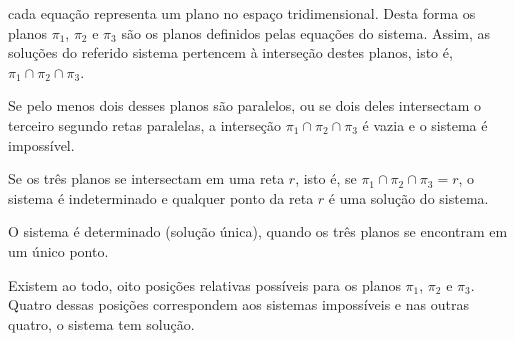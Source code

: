 \documentclass[oneside,a4paper,12pt]{article}
\begin{document}
cada equação representa um plano no espaço tridimensional. Desta forma os planos $\pi_1$, $\pi_2$ e $\pi_3$ são os planos definidos pelas equações do sistema. Assim, as soluções do referido sistema pertencem à interseção destes planos, isto é, $\pi_1 \cap \pi_2 \cap \pi_3$.

Se pelo menos dois desses planos são paralelos, ou se dois deles intersectam o terceiro segundo retas paralelas, a interseção $\pi_1 \cap \pi_2 \cap \pi_3$ é vazia e o sistema é impossível.

Se os três planos se intersectam em uma reta $r$, isto é, se $\pi_1 \cap \pi_2 \cap \pi_3 = r$, o sistema é indeterminado e qualquer ponto da reta $r$ é uma solução do sistema.

O sistema é determinado (solução única), quando os três planos se encontram em um único ponto.

Existem ao todo, oito posições relativas possíveis para os planos $\pi_1$, $\pi_2$ e $\pi_3$. Quatro dessas posições correspondem aos sistemas impossíveis e nas outras quatro, o sistema tem
solução.
\end{document}
